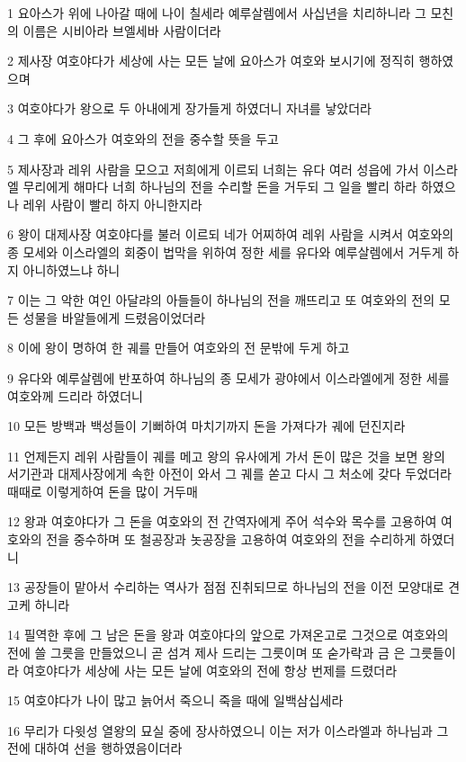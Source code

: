 \par 1 요아스가 위에 나아갈 때에 나이 칠세라 예루살렘에서 사십년을 치리하니라 그 모친의 이름은 시비아라 브엘세바 사람이더라
\par 2 제사장 여호야다가 세상에 사는 모든 날에 요아스가 여호와 보시기에 정직히 행하였으며
\par 3 여호야다가 왕으로 두 아내에게 장가들게 하였더니 자녀를 낳았더라
\par 4 그 후에 요아스가 여호와의 전을 중수할 뜻을 두고
\par 5 제사장과 레위 사람을 모으고 저희에게 이르되 너희는 유다 여러 성읍에 가서 이스라엘 무리에게 해마다 너희 하나님의 전을 수리할 돈을 거두되 그 일을 빨리 하라 하였으나 레위 사람이 빨리 하지 아니한지라
\par 6 왕이 대제사장 여호야다를 불러 이르되 네가 어찌하여 레위 사람을 시켜서 여호와의 종 모세와 이스라엘의 회중이 법막을 위하여 정한 세를 유다와 예루살렘에서 거두게 하지 아니하였느냐 하니
\par 7 이는 그 악한 여인 아달랴의 아들들이 하나님의 전을 깨뜨리고 또 여호와의 전의 모든 성물을 바알들에게 드렸음이었더라
\par 8 이에 왕이 명하여 한 궤를 만들어 여호와의 전 문밖에 두게 하고
\par 9 유다와 예루살렘에 반포하여 하나님의 종 모세가 광야에서 이스라엘에게 정한 세를 여호와께 드리라 하였더니
\par 10 모든 방백과 백성들이 기뻐하여 마치기까지 돈을 가져다가 궤에 던진지라
\par 11 언제든지 레위 사람들이 궤를 메고 왕의 유사에게 가서 돈이 많은 것을 보면 왕의 서기관과 대제사장에게 속한 아전이 와서 그 궤를 쏟고 다시 그 처소에 갖다 두었더라 때때로 이렇게하여 돈을 많이 거두매
\par 12 왕과 여호야다가 그 돈을 여호와의 전 간역자에게 주어 석수와 목수를 고용하여 여호와의 전을 중수하며 또 철공장과 놋공장을 고용하여 여호와의 전을 수리하게 하였더니
\par 13 공장들이 맡아서 수리하는 역사가 점점 진취되므로 하나님의 전을 이전 모양대로 견고케 하니라
\par 14 필역한 후에 그 남은 돈을 왕과 여호야다의 앞으로 가져온고로 그것으로 여호와의 전에 쓸 그릇을 만들었으니 곧 섬겨 제사 드리는 그릇이며 또 숟가락과 금 은 그릇들이라 여호야다가 세상에 사는 모든 날에 여호와의 전에 항상 번제를 드렸더라
\par 15 여호야다가 나이 많고 늙어서 죽으니 죽을 때에 일백삼십세라
\par 16 무리가 다윗성 열왕의 묘실 중에 장사하였으니 이는 저가 이스라엘과 하나님과 그 전에 대하여 선을 행하였음이더라
